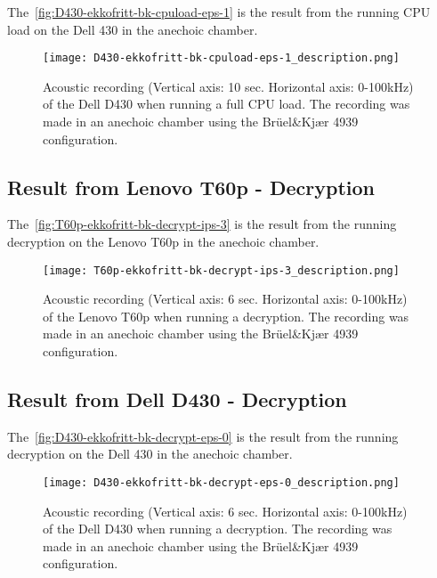 The~\autoref{fig:D430-ekkofritt-bk-cpuload-eps-1} is the result from the running CPU load on the Dell 430 in the anechoic chamber. 
\begin{figure}[ht]
    \centering
    \texttt{[image: D430-ekkofritt-bk-cpuload-eps-1\_description.png]}
    \caption{Acoustic recording (Vertical axis: 10 sec. Horizontal axis: 0-100kHz) of the Dell D430 when running a full CPU load. The recording was made in an anechoic chamber using the Brüel\&Kjær 4939 configuration. }
    \label{fig:D430-ekkofritt-bk-cpuload-eps-1}
\end{figure}


\subsection{Result from Lenovo T60p - Decryption}\label{chp5:subsec:t60p_bk_results_decryption}

The~\autoref{fig:T60p-ekkofritt-bk-decrypt-ips-3} is the result from the running decryption on the Lenovo T60p in the anechoic chamber. 
\begin{figure}[ht]
    \centering
    \texttt{[image: T60p-ekkofritt-bk-decrypt-ips-3\_description.png]}
    \caption{Acoustic recording (Vertical axis: 6 sec. Horizontal axis: 0-100kHz) of the Lenovo T60p when running a decryption. The recording was made in an anechoic chamber using the Brüel\&Kjær 4939 configuration. }
    \label{fig:T60p-ekkofritt-bk-decrypt-ips-3}
\end{figure}

\subsection{Result from Dell D430 - Decryption}\label{chp5:subsec:d430_bk_results_cpuload}

The~\autoref{fig:D430-ekkofritt-bk-decrypt-eps-0} is the result from the running decryption on the Dell 430 in the anechoic chamber. 
\begin{figure}[ht]
    \centering
    \texttt{[image: D430-ekkofritt-bk-decrypt-eps-0\_description.png]}
    \caption{Acoustic recording (Vertical axis: 6 sec. Horizontal axis: 0-100kHz) of the Dell D430 when running a decryption. The recording was made in an anechoic chamber using the Brüel\&Kjær 4939 configuration.}
    \label{fig:D430-ekkofritt-bk-decrypt-eps-0}
\end{figure}


